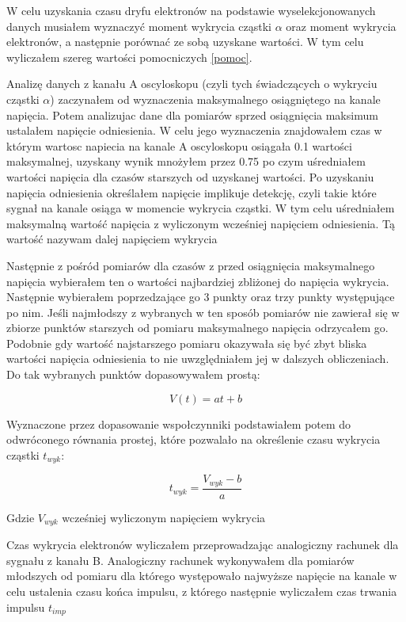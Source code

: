 \documentclass[10pt,a4paper]{article}
\begin{document}
W celu uzyskania czasu dryfu elektronów na podstawie wyselekcjonowanych danych musiałem wyznaczyć moment wykrycia cząstki $\alpha$ oraz moment wykrycia elektronów, a następnie porównać ze sobą uzyskane wartości. W tym celu wyliczałem szereg wartości pomocniczych \ref{pomoc}.

Analizę danych z kanału A oscyloskopu (czyli tych świadczących o wykryciu cząstki $\alpha$) zaczynałem od wyznaczenia maksymalnego osiągniętego na kanale napięcia.
Potem analizujac dane dla pomiarów sprzed osiągnięcia maksimum ustalałem napięcie odniesienia. W celu jego wyznaczenia znajdowałem czas w którym wartosc napiecia na kanale A oscyloskopu osiągała 0.1 wartości maksymalnej, uzyskany wynik mnożyłem przez 0.75 po czym uśredniałem wartości napięcia dla czasów starszych od uzyskanej wartości. Po uzyskaniu napięcia odniesienia określałem napięcie implikuje detekcję, czyli takie które sygnał na kanale osiąga w momencie wykrycia cząstki. W tym celu uśredniałem maksymalną wartość napięcia z wyliczonym wcześniej napięciem odniesienia. Tą wartość nazywam dalej napięciem wykrycia

Następnie z pośród pomiarów dla czasów z przed osiągnięcia maksymalnego napięcia wybierałem ten o wartości najbardziej zbliżonej do napięcia wykrycia. Następnie wybierałem poprzedzające go 3 punkty oraz trzy punkty występujące po nim. Jeśli najmłodszy z wybranych w ten sposób pomiarów nie zawierał się w zbiorze punktów starszych od pomiaru maksymalnego napięcia odrzycałem go. Podobnie gdy wartość najstarszego pomiaru okazywała się być zbyt bliska wartości napięcia odniesienia to nie uwzględniałem jej w dalszych obliczeniach. Do tak wybranych punktów dopasowywałem prostą:

\begin{equation*}
    V(t) = at + b
\end{equation*}

Wyznaczone przez dopasowanie wspołczynniki podstawiałem potem do odwróconego równania prostej, które pozwalało na określenie czasu wykrycia cząstki $t_{wyk}$:

\begin{equation*}
    t_{wyk} = \frac{V_{wyk}-b}{a}
\end{equation*}

Gdzie $V_{wyk}$ wcześniej wyliczonym napięciem wykrycia

Czas wykrycia elektronów wyliczałem przeprowadzając analogiczny rachunek dla sygnału z kanału B. Analogiczny rachunek wykonywałem dla pomiarów młodszych od pomiaru dla którego występowało najwyższe napięcie na kanale w celu ustalenia czasu końca impulsu, z którego następnie wyliczałem czas trwania impulsu $t_{imp}$
\end{document}
